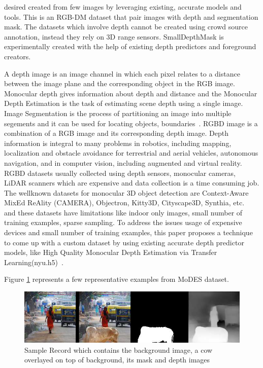 \documentclass[review]{cvpr}
\begin{document}
desired created from few images by leveraging existing, 
accurate models and tools. This is an RGB-DM dataset that pair images with depth and segmentation mask. The datasets which involve depth cannot be 
created using crowd source annotation, instead they rely on 3D range sensors. SmallDepthMask is experimentally created with the help of existing 
depth predictors and foreground creators.

A depth image is an image channel in which each pixel relates to a distance between the image plane and the corresponding object in the RGB image.
Monocular depth gives information about depth and distance and the Monocular Depth Estimation is the task of estimating scene depth 
using a single image\cite{abuolaim2020defocus}. 
Image Segmentation is the process of partitioning an image into multiple segements and it can be used for locating objects, boundaries~\cite{amza2012review}. 
RGBD image is a combination of a RGB image and its corresponding depth image\cite{zhang2018deep}.
 Depth information is integral to many problems in
robotics, including mapping, localization and obstacle avoidance for terrestrial and aerial vehicles, autonomous navigation, and in computer vision,
 including augmented and virtual reality\cite{marchand2015pose}. RGBD datasets usually collected using depth sensors, monocular cameras, 
 LiDAR scanners which are expensive and data collection is a time consuming job. The wellknown datasets for monocular 3D object detection 
 are Context-Aware MixEd ReAlity (CAMERA), Objectron, Kitty3D, Cityscape3D, Synthia, etc.~\cite{} and these datasets have 
 limitations like indoor only images, small number of training examples, sparse sampling. To address the issues usage of 
 expensive devices and small number of training examples, this paper proposes a technique to come up with a custom dataset 
 by using existing accurate depth predictor models, like High Quality Monocular Depth Estimation via Transfer Learning(nyu.h5)~\cite{alhashim2018high}. 
 

Figure \ref{fig:sampledatarecord} represents a few representative examples from MoDES dataset.

\begin{figure}
  \begin{center}
    \includegraphics[width=1\textwidth]{samplerecord.png}
  \end{center}
  \caption{Sample Record which contains the background image, a cow overlayed on top of background, its mask and depth images}
  \label{fig:sampledatarecord}
\end{figure}
\end{document}
